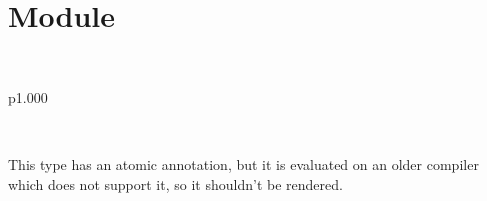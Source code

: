 \section{Module }\label{Annotations_unsupported}%
\label{Annotations_unsupported--type-refcounted}\\
\begin{ocamltabular}{p{1.000\textwidth}}\label{Annotations_unsupported--type-refcounted.readers}\\
\end{ocamltabular}%
\\
\ocamlcodefragment{\}}\begin{ocamlindent}This type has an atomic annotation, but it is evaluated on an older compiler which does not support it, so it shouldn't be rendered.\end{ocamlindent}%
\medbreak



